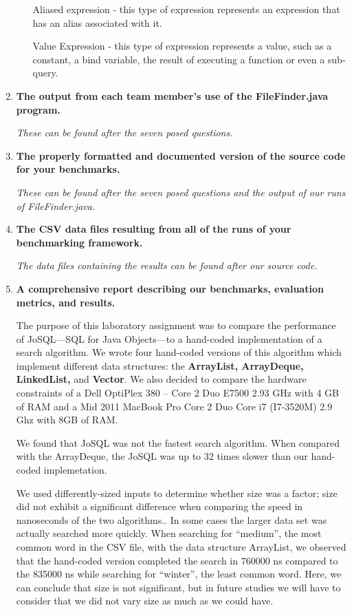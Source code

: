 \begin{enumerate}
\begin{itemize}
\begin{center}
					Aliased expression - this type of expression represents an
					expression that has an alias associated with it.

					Value Expression - this type of expression represents a value,
					such as a constant, a bind variable, the result of executing a
					function or even a sub-query.
				\end{center}

		\end{itemize}
	\item \textbf{The output from each team member's use of the FileFinder.java program.}\par
		\textit{These can be found after the seven posed questions.}

	\item \textbf{The properly formatted and documented version of the source code
			for your benchmarks.}\par
		\textit{These can be found after the seven posed questions and the output of our runs of FileFinder.java.}

	\item \textbf{The CSV data files resulting from all of the runs of your
			benchmarking framework.}\par
		\textit{The data files containing the results can be found after our source code.}

	\item \textbf{A comprehensive report describing our benchmarks, evaluation
			metrics, and results.}\par
		The purpose of this laboratory assignment was to compare the performance of
		JoSQL---SQL for Java Objects---to a hand-coded implementation of a search
		algorithm. We wrote four hand-coded versions of this algorithm which implement
		different data structures: the \textbf{ArrayList, ArrayDeque, LinkedList,} and \textbf{Vector}.
		We also decided to compare the hardware constraints of a
		Dell OptiPlex 380 -- Core 2 Duo E7500 2.93 GHz with 4 GB of RAM and a
		Mid 2011 MacBook Pro Core 2 Duo Core i7 (I7-3520M) 2.9 Ghz with 8GB of RAM.

		\medskip \par
		We found that JoSQL was not the fastest search algorithm. When compared with the 
		ArrayDeque, the JoSQL was up to 32 times slower than our hand-coded implemetation.

		\medskip \par
		We used differently-sized inputs to determine whether size was a factor; size did 
		not exhibit a significant difference when comparing the speed in nanoseconds of the 
		two algorithms.. In some cases the larger data set was actually searched more quickly. 
		When searching for ``medium'', the most common word in the CSV file, with the data 
		structure ArrayList, we observed that the hand-coded version completed the search in 
		760000 ns compared to the 835000 ns while searching for ``winter'', the least common word.
		Here, we can conclude that size is not significant, but in future studies we will have to 
		consider that we did not vary size as much as we could have.


\end{enumerate}
